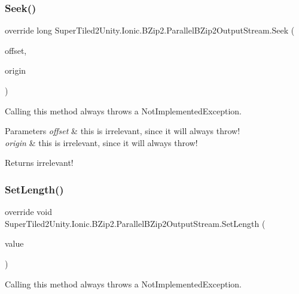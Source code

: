 \subsubsection{\texorpdfstring{Seek()}{Seek()}}
{\footnotesize\ttfamily override long Super\+Tiled2\+Unity.\+Ionic.\+B\+Zip2.\+Parallel\+B\+Zip2\+Output\+Stream.\+Seek (\begin{DoxyParamCaption}\item[{long}]{offset,  }\item[{System.\+I\+O.\+Seek\+Origin}]{origin }\end{DoxyParamCaption})}



Calling this method always throws a Not\+Implemented\+Exception. 


\begin{DoxyParams}{Parameters}
{\em offset} & this is irrelevant, since it will always throw!\\
\hline
{\em origin} & this is irrelevant, since it will always throw!\\
\hline
\end{DoxyParams}
\begin{DoxyReturn}{Returns}
irrelevant!
\end{DoxyReturn}
\mbox{\label{class_super_tiled2_unity_1_1_ionic_1_1_b_zip2_1_1_parallel_b_zip2_output_stream_a7cea59ceac611f61faed6a94be94dd0a}} 
\subsubsection{\texorpdfstring{Set\+Length()}{SetLength()}}
{\footnotesize\ttfamily override void Super\+Tiled2\+Unity.\+Ionic.\+B\+Zip2.\+Parallel\+B\+Zip2\+Output\+Stream.\+Set\+Length (\begin{DoxyParamCaption}\item[{long}]{value }\end{DoxyParamCaption})}



Calling this method always throws a Not\+Implemented\+Exception. 


